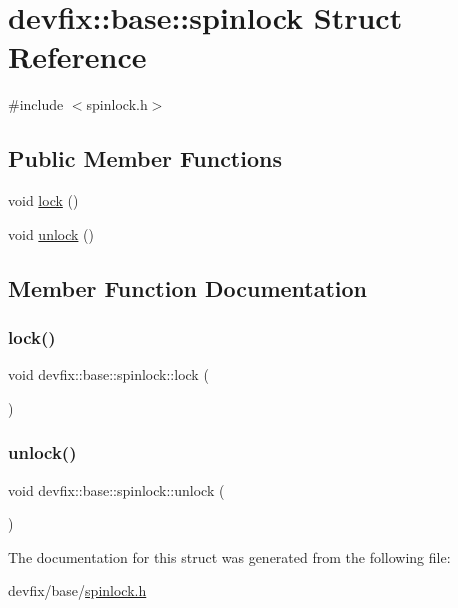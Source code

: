 \hypertarget{structdevfix_1_1base_1_1spinlock}{}\section{devfix\+:\+:base\+:\+:spinlock Struct Reference}
\label{structdevfix_1_1base_1_1spinlock}


{\ttfamily \#include $<$spinlock.\+h$>$}

\subsection*{Public Member Functions}
\begin{DoxyCompactItemize}
\item 
void \hyperlink{structdevfix_1_1base_1_1spinlock_aa10a97f8574acc2fd400fcf3ac5f5691}{lock} ()
\item 
void \hyperlink{structdevfix_1_1base_1_1spinlock_a91dac7a50de880750ef0a0225dca79a3}{unlock} ()
\end{DoxyCompactItemize}


\subsection{Member Function Documentation}
\mbox{\label{structdevfix_1_1base_1_1spinlock_aa10a97f8574acc2fd400fcf3ac5f5691}} 
\subsubsection{\texorpdfstring{lock()}{lock()}}
{\footnotesize\ttfamily void devfix\+::base\+::spinlock\+::lock (\begin{DoxyParamCaption}{ }\end{DoxyParamCaption})\hspace{0.3cm}{\ttfamily [inline]}}

\mbox{\label{structdevfix_1_1base_1_1spinlock_a91dac7a50de880750ef0a0225dca79a3}} 
\subsubsection{\texorpdfstring{unlock()}{unlock()}}
{\footnotesize\ttfamily void devfix\+::base\+::spinlock\+::unlock (\begin{DoxyParamCaption}{ }\end{DoxyParamCaption})\hspace{0.3cm}{\ttfamily [inline]}}



The documentation for this struct was generated from the following file\+:\begin{DoxyCompactItemize}
\item 
devfix/base/\hyperlink{spinlock_8h}{spinlock.\+h}\end{DoxyCompactItemize}
